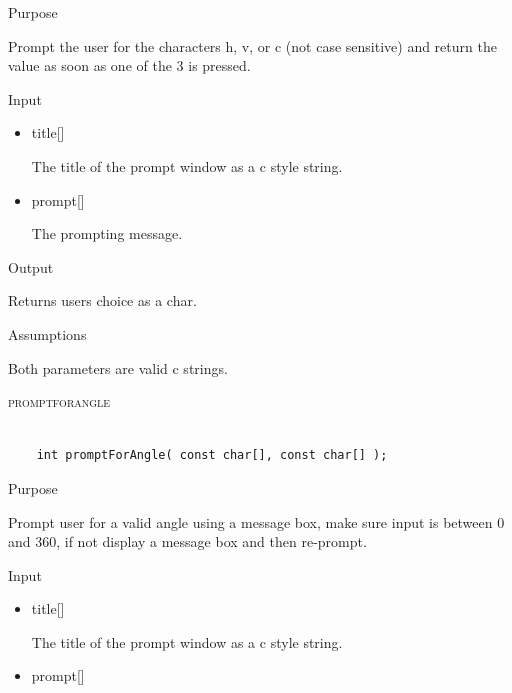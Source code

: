 \documentclass[pdftex, 11pt]{article}
\begin{document}
\begin{description}
		\begin{description}
			\item{Purpose}

				Prompt the user for the characters h, v, or c (not case sensitive) and return
				the value as soon as one of the 3 is pressed.

			\item{Input}

				\begin{itemize}
					
					\item{title[]}

						The title of the prompt window as a c style string.

					\item{prompt[]}

						The prompting message.

				\end{itemize}

			\item{Output}

				Returns users choice as a char.

			\item{Assumptions}

				Both parameters are valid c strings.

		\end{description}


	\item{\textsc{promptforangle}}

		\begin{lstlisting}

	int promptForAngle( const char[], const char[] );
		\end{lstlisting}

		\begin{description}
			\item{Purpose}

				Prompt user for a valid angle using a message box, make sure input is between
				0 and 360, if not display a message box and then re-prompt.

			\item{Input}

				\begin{itemize}
					
					\item{title[]}

						The title of the prompt window as a c style string.

					\item{prompt[]}


\end{itemize}
\end{description}
\end{description}
\end{document}
